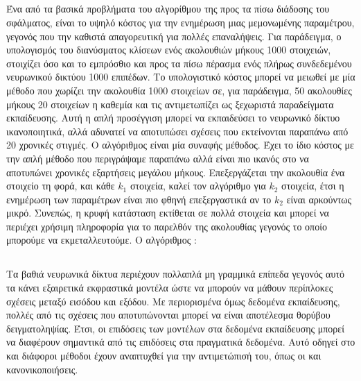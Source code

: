 \subsection{}
Ένα από τα βασικά προβλήματα του αλγορίθμου της προς τα πίσω διάδοσης του σφάλματος, είναι το υψηλό κόστος για την ενημέρωση μιας μεμονωμένης παραμέτρου, γεγονός που την καθιστά απαγορευτική για πολλές επαναλήψεις.
Για παράδειγμα, ο υπολογισμός του διανύσματος κλίσεων ενός  ακολουθιών μήκους 1000 στοιχειών, στοιχίζει όσο και το εμπρόσθιο και προς τα πίσω πέρασμα ενός πλήρως συνδεδεμένου νευρωνικού δικτύου 1000 επιπέδων.
Το υπολογιστικό κόστος μπορεί να μειωθεί με μία μέθοδο που χωρίζει την ακολουθία 1000 στοιχείων σε, για παράδειγμα, 50 ακολουθίες μήκους 20 στοιχείων η καθεμία και τις αντιμετωπίζει ως ξεχωριστά παραδείγματα εκπαίδευσης.
Αυτή η απλή προσέγγιση μπορεί να εκπαιδεύσει το νευρωνικό δίκτυο ικανοποιητικά, αλλά αδυνατεί να αποτυπώσει σχέσεις που εκτείνονται παραπάνω από 20 χρονικές στιγμές.
Ο αλγόριθμος  είναι μία συναφής μέθοδος.
Έχει το ίδιο κόστος με την απλή μέθοδο που περιγράψαμε παραπάνω αλλά είναι πιο ικανός στο να αποτυπώνει χρονικές εξαρτήσεις μεγάλου μήκους.
Επεξεργάζεται την ακολουθία ένα στοιχείο τη φορά, και κάθε $k_1$ στοιχεία, καλεί τον αλγόριθμο  για $k_2$ στοιχεία, έτσι η ενημέρωση των παραμέτρων είναι πιο φθηνή επεξεργαστικά αν το $k_2$ είναι αρκούντως μικρό.
Συνεπώς, η κρυφή κατάσταση εκτίθεται σε πολλά στοιχεία και μπορεί να περιέχει χρήσιμη πληροφορία για το παρελθόν της ακολουθίας γεγονός το οποίο μπορούμε να εκμεταλλευτούμε.
Ο αλγόριθμος :

\begin{algorithm}
\caption{}
\begin{algorithmic}
\ENDIF
\ENDFOR
\end{algorithmic}
\end{algorithm}

\subsection{}

Τα βαθιά νευρωνικά δίκτυα περιέχουν πολλαπλά μη γραμμικά επίπεδα γεγονός αυτό τα κάνει εξαιρετικά εκφραστικά μοντέλα ώστε να μπορούν να μάθουν περίπλοκες σχέσεις μεταξύ εισόδου και εξόδου.
Με περιορισμένα όμως δεδομένα εκπαίδευσης, πολλές από τις σχέσεις που αποτυπώνονται μπορεί να είναι αποτέλεσμα θορύβου δειγματοληψίας. Έτσι, οι επιδόσεις των μοντέλων στα δεδομένα εκπαίδευσης μπορεί να διαφέρουν σημαντικά από τις επιδόσεις στα πραγματικά δεδομένα.
Αυτό οδηγεί στο  και διάφοροι μέθοδοι έχουν αναπτυχθεί για την αντιμετώπισή του, όπως οι  και  κανονικοποιήσεις.

